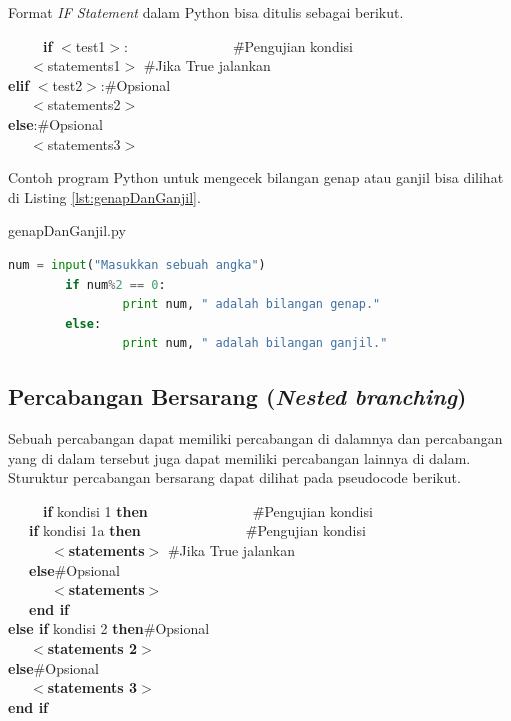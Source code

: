 Format \textit{IF Statement} dalam Python bisa ditulis sebagai berikut.

\begin{tabbing}
~~~~~\=\textbf{if} $<$test1$>$:~~~~~~~~~~~~~~~\=\#Pengujian kondisi\\
\>~~~$<$statements1$>$ \> \#Jika True jalankan\\
\>\textbf{elif} $<$test2$>$:\>\#Opsional\\
\>~~~$<$statements2$>$\>\\
\>\textbf{else}:\>\#Opsional\\
\>~~~$<$statements3$>$\>\\
\end{tabbing}

Contoh program Python untuk mengecek bilangan genap atau ganjil bisa dilihat di Listing \ref{lst:genapDanGanjil}.

\begin{listprog}{genapDanGanjil.py}
	\label{lst:genapDanGanjil}
	\begin{lstlisting}[language=Python]
		num = input("Masukkan sebuah angka")
		if num%2 == 0:
				print num, " adalah bilangan genap."
		else:
				print num, " adalah bilangan ganjil."
	\end{lstlisting}
\end{listprog}


\subsection{Percabangan Bersarang (\textit{Nested branching})}
Sebuah percabangan dapat memiliki percabangan di dalamnya dan percabangan yang di dalam tersebut juga dapat memiliki percabangan lainnya di dalam. Sturuktur percabangan bersarang dapat dilihat pada pseudocode berikut.

\begin{tabbing}
~~~~~\=\textbf{if} kondisi 1 \textbf{then}~~~~~~~~~~~~~~~\=\#Pengujian kondisi\\
\>~~~\textbf{if} kondisi 1a \textbf{then}~~~~~~~~~~~~~~~\=\#Pengujian kondisi\\
\>~~~~~~$<$\textbf{statements}$>$ \> \#Jika True jalankan\\
\>~~~\textbf{else}\>\#Opsional\\
\>~~~~~~$<$\textbf{statements}$>$\>\\
\>~~~\textbf{end if}\\
\>\textbf{else if } kondisi 2 \textbf{then}\>\#Opsional\\
\>~~~$<$\textbf{statements 2}$>$\>\\
\>\textbf{else}\>\#Opsional\\
\>~~~$<$\textbf{statements 3}$>$\>\\
\>\textbf{end if}
\end{tabbing}

